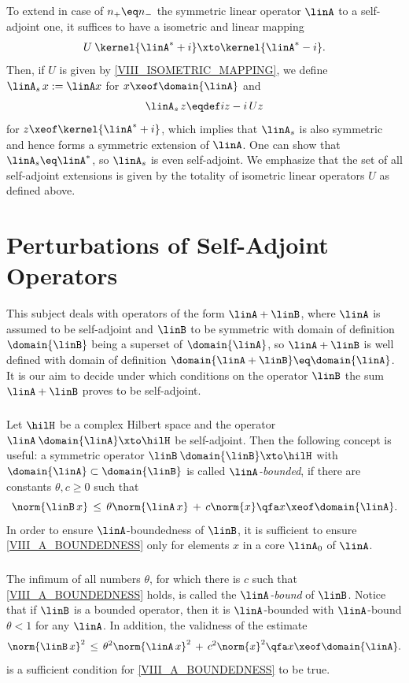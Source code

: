 \documentclass[11pt,twoside]{article}
\begin{document}
\subparagraph{}
To extend in case of $n_+ \eq n_-$ the symmetric linear operator $\linA$
to a self-adjoint one,
it suffices to have a isometric and linear mapping
\begin{equation}\label{VIII_ISOMETRIC_MAPPING}
U\: \kernel{\linA^*+i} \xto \kernel{\linA^*-i}.
\end{equation}
Then,
if $U$ is given by \eqref{VIII_ISOMETRIC_MAPPING},
we define $\linA_s \,x := \linA x$ for $x \xeof \domain{\linA}$ and
\[
\linA_s \,z \eqdef iz -i \, U z
\]
for $z \xeof \kernel{\linA^* + i}$,
which implies that $\linA_s$ is also symmetric
and hence forms a symmetric extension of $\linA$.
One can show that $\linA_s \eq \linA^*$,
so $\linA_s$ is even self-adjoint.
We emphasize that
the set of all self-adjoint extensions is given
by the totality of isometric linear operators $U$ as defined above.

\section{Perturbations of Self-Adjoint Operators}
This subject deals with operators of the form $\linA + \linB$,
where $\linA$ is assumed to be self-adjoint and $\linB$ to be symmetric
with domain of definition $\domain{\linB}$ being a superset of $\domain{\linA}$,
so $\linA + \linB$ is well defined
with domain of definition $\domain{\linA + \linB} \eq \domain{\linA}$.
It is our aim to decide
under which conditions on the operator $\linB$
the sum $\linA + \linB$ proves to be self-adjoint.

\subparagraph{} %
Let $\hilH$ be a complex Hilbert space and the operator
$\linA \: \domain{\linA} \xto \hilH$ be self-adjoint.
Then the following concept is useful:
a symmetric operator $\linB\:\domain{\linB} \xto \hilH$
with $\domain{\linA} \subset \domain{\linB}$
is called $\linA$\textit{-bounded},
if there are constants $\theta, c \geq 0$ such that
\begin{equation}\label{VIII_A_BOUNDEDNESS}
\norm{\linB \,x} \, \leq \, \theta \norm{\linA \,x} \, + \, c \norm{x}
\qfa x \xeof \domain{\linA}.
\end{equation}
In order to ensure $\linA$-boundedness of $\linB$,
it is sufficient to ensure \eqref{VIII_A_BOUNDEDNESS}
only for elements $x$ in a core $\linA_0$ of $\linA$.

\subparagraph{} %
The infimum of all numbers $\theta$,
for which there is $c$ such that \eqref{VIII_A_BOUNDEDNESS} holds,
is called the $\linA$\textit{-bound} of $\linB$.
Notice that if $\linB$ is a bounded operator,
then it is $\linA$-bounded with $\linA$-bound $\theta <1$ for any $\linA$.
In addition,
the validness of the estimate
\[
\norm{\linB \,x}^2 \, \leq \,
\theta^2 \norm{\linA \,x}^2 \, + \, c^2 \norm{x}^2
\qfa x \xeof \domain{\linA}.
\]
is a sufficient condition for \eqref{VIII_A_BOUNDEDNESS} to be true.
\end{document}
